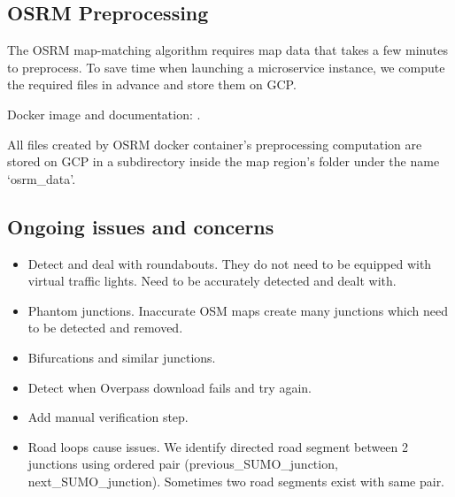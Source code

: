 \documentclass[letterpaper,10pt,english]{sphinxmanual}
\begin{document}
\subsection{OSRM Preprocessing}
\label{\detokenize{microservices/map_preprocessing/osrm_preprocessing:osrm-preprocessing}}\label{\detokenize{microservices/map_preprocessing/osrm_preprocessing::doc}}
The OSRM map-matching algorithm requires map data that takes a few minutes to preprocess.
To save time when launching a {\hyperref[\detokenize{microservices/vehicle_localization/index:vehicle-localization}]{}} microservice instance, we compute the required files in advance and store them on GCP.

Docker image and documentation: .

All files created by OSRM docker container’s preprocessing computation are stored on GCP in a subdirectory inside the map region’s folder under the name ‘osrm\_data’.


\subsection{Ongoing issues and concerns}
\label{\detokenize{microservices/map_preprocessing/ongoing_issues:ongoing-issues-and-concerns}}\label{\detokenize{microservices/map_preprocessing/ongoing_issues::doc}}\begin{itemize}
\item {} 
Detect and deal with roundabouts.
They do not need to be equipped with virtual traffic lights.
Need to be accurately detected and dealt with.

\item {} 
Phantom junctions.
Inaccurate OSM maps create many  junctions which need to be detected and removed.

\item {} 
Bifurcations and similar junctions.

\item {} 
Detect when Overpass download fails and try again.

\item {} 
Add manual verification step.

\item {} 
Road loops cause issues.
We identify directed road segment between 2 junctions using ordered pair (previous\_SUMO\_junction, next\_SUMO\_junction).
Sometimes two road segments exist with same pair.

\end{itemize}
\end{document}
